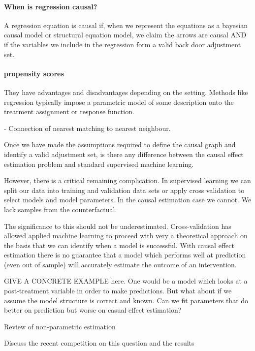 \documentclass[11pt,a4paper,oneside]{book}
\theoremstyle{plain}
\theoremstyle{definition}
\begin{document}
\paragraph*{When is regression causal?}
A regression equation is causal if, when we represent the equations as a bayesian causal model or structural equation model, we claim the arrows are causal AND if the variables we include in the regression form a valid back door adjustment set. 


\paragraph*{propensity scores}

They have advantages and disadvantages depending on the setting. Methods like regression typically impose a parametric model of some description onto the treatment assignment or response function. 

- Connection of nearest matching to nearest neighbour. 

Once we have made the assumptions required to define the causal graph and identify a valid adjustment set, is there any difference between the causal effect estimation problem and standard supervised machine learning. 

\cite{causal estimation is covariate shift}

However, there is a critical remaining complication. In supervised learning we can split our data into training and validation data sets or apply cross validation to select models and model parameters. In the causal estimation case we cannot. We lack samples from the counterfactual. 

The significance to this should not be underestimated. Cross-validation has allowed applied machine learning to proceed with very a theoretical approach on the basis that we can identify when a model is successful. With causal effect estimation there is no guarantee that a model which performs well at prediction (even out of sample) will accurately estimate the outcome of an intervention. 

GIVE A CONCRETE EXAMPLE here. One would be a model which looks at a post-treatment variable in order to make predictions. But what about if we assume the model structure is correct and known.  Can we fit parameters that do better on prediction but worse on casual effect estimation?

\cite{Imbens2004} Review of non-parametric estimation

Discuss the recent competition on this question and the results
\end{document}
